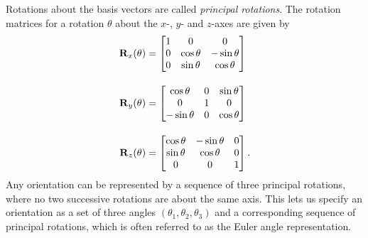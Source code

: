 Rotations about the basis vectors are called \emph{principal rotations}.
The rotation matrices for a rotation $\theta$ about the $x$-, $y$- and $z$-axes are given by
\begin{align}
  {\boldsymbol{\mathbf{R}}}_x(\theta) &= 
  \begin{bmatrix}
    1 & 0 & 0\\
    0 & \cos \theta & -\sin \theta\\
    0 & \sin \theta & \cos \theta
  \end{bmatrix}\\[1em]
  {\boldsymbol{\mathbf{R}}}_y(\theta) &= 
  \begin{bmatrix}
    \cos \theta & 0 & \sin \theta\\
    0 & 1 & 0\\
    -\sin \theta & 0 & \cos \theta
  \end{bmatrix}\\[1em]
  {\boldsymbol{\mathbf{R}}}_z(\theta) &= 
  \begin{bmatrix}
    \cos \theta & -\sin \theta & 0\\
    \sin \theta & \cos \theta & 0\\
    0 & 0 & 1
  \end{bmatrix}.
\end{align}
Any orientation can be represented by a sequence of three principal rotations, where no two successive rotations are about the same axis.
This lets us specify an orientation as a set of three angles $(\theta_1, \theta_2, \theta_3)$ and a corresponding sequence of principal rotations, which is often referred to as the Euler angle representation.

